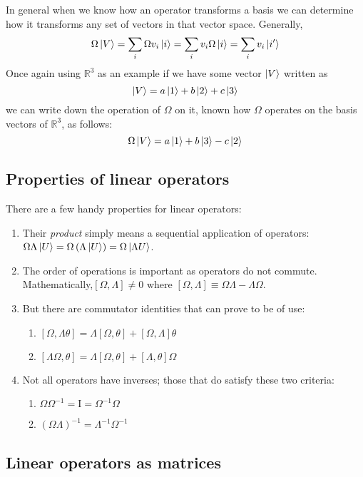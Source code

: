 \documentclass[english,seminar,headertitle]{lecture}
\begin{document}
In general when we know how an operator transforms a basis we can determine how it transforms any set of vectors in that vector space. Generally,
\[
	\Omega\ket{V} = \sum_i\Omega v_i \ket{i} = \sum_i v_i\Omega\ket{i} = \sum_i v_i\ket{i'}
\]
Once again using $\mathbb{R}^3$ as an example if we have some vector $\ket{V}$ written as
\[
	\ket{V} = a\ket{1} + b\ket{2} + c\ket{3}
\]
we can write down the operation of $\Omega$ on it, known how $\Omega$ operates on the basis vectors of $\mathbb{R}^3$, as follows:
\[
	\Omega\ket{V} = a\ket{1} + b\ket{3} - c\ket{2}
\]

\subsection{Properties of linear operators}
There are a few handy properties for linear operators:
\begin{enumerate}
	\item Their \textit{product} simply means a sequential application of operators:\nl $\Omega\Lambda\ket{U} = \Omega\left(\Lambda\ket{U}\right) = \Omega\ket{\Lambda U}$.
	\item The order of operations is important as operators do not commute. Mathematically,\nl $\left[\Omega , \Lambda \right] \neq 0$ where $\left[\Omega , \Lambda \right] \equiv \Omega\Lambda - \Lambda\Omega$.
	\item But there are commutator identities that can prove to be of use:
		\begin{enumerate}
			\item $\left[\Omega , \Lambda\theta \right] = \Lambda\left[\Omega , \theta \right] + \left[\Omega , \Lambda \right]\theta$
			\item $\left[\Lambda\Omega , \theta \right] = \Lambda\left[\Omega , \theta \right] + \left[\Lambda , \theta \right]\Omega$
		\end{enumerate}
	\item Not all operators have inverses; those that do satisfy these two criteria:
		\begin{enumerate}
			\item $\Omega\Omega^{-1} = \textrm{I} = \Omega^{-1}\Omega$
			\item $\left(\Omega\Lambda\right)^{-1} = \Lambda^{-1}\Omega^{-1}$
		\end{enumerate}
\end{enumerate}

\subsection{Linear operators as matrices}
\end{document}
